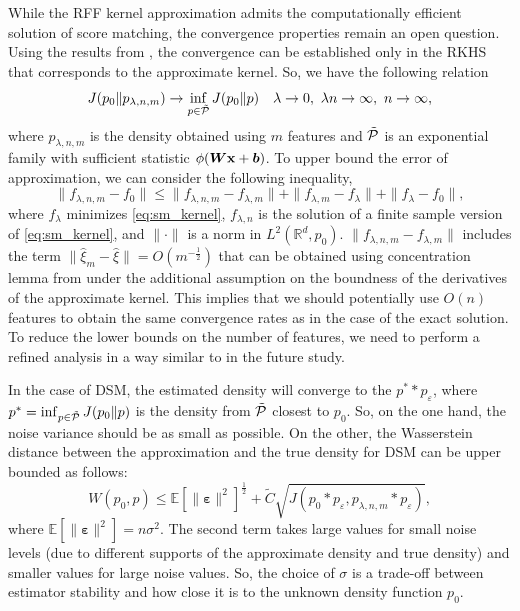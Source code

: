 While the RFF kernel approximation admits the computationally efficient solution of score matching,
the convergence properties remain an open question.
Using the results from \cite{Gretton2013}, the convergence can be established only in the
RKHS that corresponds to the approximate kernel.
So, we have the following relation
\[
    J(p_0\| p_{\lambda, n, m}) \to \inf_{p \in \Tilde{{\cal P}}}J(p_0\| p)
    \quad
    \lambda \to 0,~\lambda n \to \infty,~n \to \infty,
\]
where $p_{\lambda, n, m}$ is the density obtained using $m$ features and
$\Tilde{{\cal P}}$ is an exponential family with sufficient statistic
$\phi({\bm W}{\bf x} + {\bm b})$.
To upper bound the error of approximation, we
can consider the following inequality,
\[
    \|f_{\lambda, n, m} - f_0\| \leq
        \|f_{\lambda, n, m} - f_{\lambda, m}\| +
        \|f_{\lambda, m} - f_{\lambda}\| +
        \|f_{\lambda} - f_0\|,
\]
where $f_{\lambda}$ minimizes \eqref{eq:sm_kernel},
$f_{\lambda, n}$ is the solution of a finite sample version of \eqref{eq:sm_kernel}, and
$\|\cdot\|$ is a norm in $L^2({\mathbb{R}^d}, p_0)$.
$\|f_{\lambda,n, m} - f_{\lambda, m}\|$ includes the term $\|\hat{\xi}_m - \hat{\xi}\| = O(m^{-\frac{1}{2}})$ that can be obtained using concentration lemma from
\cite{sutherland2017efficient} under the additional assumption on the boundness
of the derivatives of the approximate kernel.
This implies that we should potentially use $O(n)$ features to obtain the same
convergence rates as in the case of the exact solution.
To reduce the lower bounds on the number of features,
we need to perform a refined analysis in a way similar to
\cite{aless2016generalization, li2018unified} in the future study.

In the case of DSM, the estimated density will converge to the
$p^* * p_{\varepsilon}$, where $p^* = \inf_{p \in \Tilde{{\cal P}}}J(p_0\| p)$
is the density from $\Tilde{\mathcal{P}}$ closest to $p_0$.
So, on the one hand, the noise variance should be as small as possible.
On the other, the Wasserstein distance
between the approximation and the true density for
DSM can be upper bounded as follows:
\[
    W(p_0, p) \leq
    \mathbb{E}[\|{\bm \varepsilon}\|^2]^{\frac{1}{2}} +
    \tilde{C}\sqrt{J(p_0 * p_{\varepsilon}, p_{\lambda, n, m} * p_{\varepsilon})},
\]
where $\mathbb{E}[\|{\bm \varepsilon}\|^2] = n\sigma^2$.
The second term takes large values for small noise levels (due to different supports
of the approximate density and true density)
and smaller values for large noise values.
So, the choice of $\sigma$ is a trade-off between estimator stability and
how close it is to the unknown density function $p_0$.


